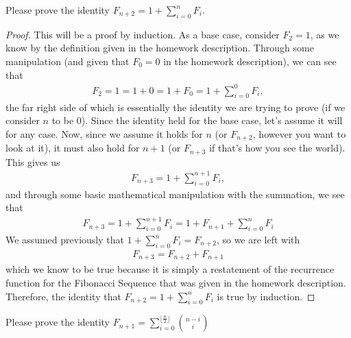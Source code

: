 \documentclass[12pt]{article}
\newenvironment{problem}[2][Problem]{\begin{trivlist}
\item[\hskip \labelsep {\bfseries #1}\hskip \labelsep {\bfseries #2.}]}{\end{trivlist}}
\begin{document}
\begin{problem}{1}
Please prove the identity $F_{n+2}=1+ \sum_{i=0}^n F_i$.
\end{problem}
 
\begin{proof}
This will be a proof by induction. As a base case, consider $F_2 = 1$, as we know by the definition given in the homework description. Through some manipulation (and given that $F_0 = 0$ in the homework description), we can see that
\begin{eqnarray}
F_2 = 1 = 1 + 0 = 1 + F_0 = 1 + \sum_{i=0}^0 F_i, \nonumber
\end{eqnarray}
the far right side of which is essentially the identity we are trying to prove (if we consider $n$ to be $0$). Since the identity held for the base case, let's assume it will for any case. Now, since we assume it holds for $n$ (or $F_{n+2}$, however you want to look at it), it must also hold for $n+1$ (or $F_{n+3}$ if that's how you see the world). This gives us
\begin{eqnarray}
F_{n+3} = 1 + \sum_{i=0}^{n+1} F_i, \nonumber
\end{eqnarray}
and through some basic mathematical manipulation with the summation, we see that
\begin{eqnarray}
F_{n+3} = 1 + \sum_{i=0}^{n+1} F_i = 1 + F_{n+1} + \sum_{i=0}^{n} F_i \nonumber
\end{eqnarray}
We assumed previously that $1+ \sum_{i=0}^{n} F_i = F_{n+2}$, so we are left with
\begin{eqnarray}
F_{n+3} = F_{n+2} + F_{n+1} \nonumber
\end{eqnarray}
which we know to be true because it is simply a restatement of the recurrence function for the Fibonacci Sequence that was given in the homework description. Therefore, the identity that $F_{n+2}=1+ \sum_{i=0}^n F_i$ is true by induction.
\end{proof}

\begin{problem}{2}
Please prove the identity $F_{n+1}= \sum_{i=0}^{\lfloor \frac{n}{2} \rfloor} \binom{n-i}{i}$
\end{problem}
\end{document}
